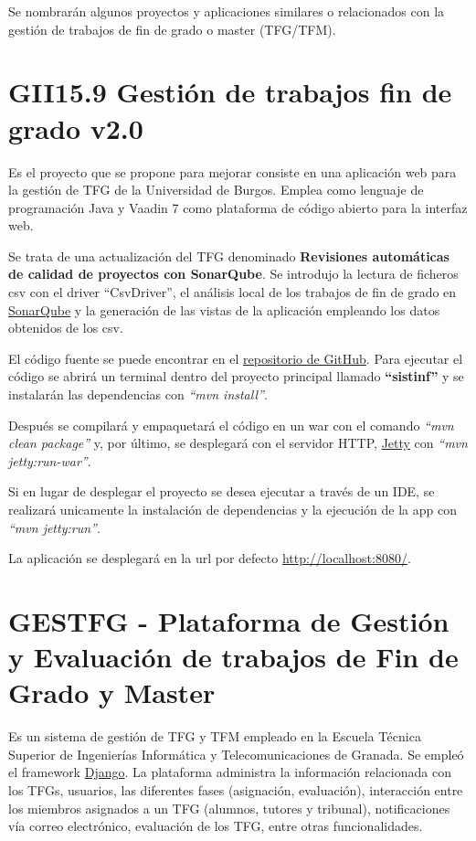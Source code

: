 Se nombrarán algunos proyectos y aplicaciones similares o relacionados con la gestión de trabajos de fin de grado o master (TFG/TFM). 

\section{GII15.9 Gestión de trabajos fin de grado v2.0}
Es el proyecto que se propone para mejorar consiste en una aplicación web para la gestión de TFG de la Universidad de Burgos. Emplea como lenguaje de programación Java y Vaadin 7 como plataforma de código abierto para la interfaz web. 

Se trata de una actualización del TFG denominado \textbf{Revisiones automáticas de calidad de proyectos con SonarQube}. Se introdujo la lectura de ficheros csv con el driver ``CsvDriver'', el análisis local de los trabajos de fin de grado en \href{https://www.sonarqube.org/}{SonarQube} y la generación de las vistas de la aplicación empleando los datos obtenidos de los csv.

El código fuente se puede encontrar en el \href{https://github.com/jfb0019/Gestor-TFG-2016}{repositorio de GitHub}. Para ejecutar el código se abrirá un terminal dentro del proyecto principal llamado \textbf{``sistinf''} y se instalarán las dependencias con \emph{``mvn install''}. 

Después se compilará y empaquetará el código en un war con el comando \emph{``mvn clean package''} y, por último, se desplegará con el servidor HTTP, \href{https://www.eclipse.org/jetty/}{Jetty} con \emph{``mvn jetty:run-war''}. 

Si en lugar de desplegar el proyecto se desea ejecutar a través de un IDE, se realizará unicamente la instalación de dependencias y la ejecución de la app con \emph{``mvn jetty:run''}.

La aplicación se desplegará en la url por defecto \href{http://localhost:8080/}{http://localhost:8080/}.

\section{GESTFG - Plataforma de Gestión y Evaluación de trabajos de Fin de Grado y Master}
Es un sistema de gestión de TFG y TFM empleado en la Escuela Técnica Superior de Ingenierías Informática y Telecomunicaciones de Granada. Se empleó el framework \href{https://www.djangoproject.com/}{Django}. La plataforma administra la información relacionada con los TFGs, usuarios, las diferentes fases (asignación, evaluación), interacción entre los miembros asignados a un TFG (alumnos, tutores y tribunal), notificaciones vía correo electrónico, evaluación de los TFG, entre otras funcionalidades.

